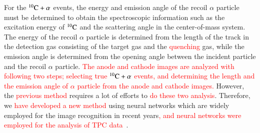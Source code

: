 \documentclass{jps-cp}
\begin{document}
For the ${}^{10}\rm{C}+\alpha$ events, the energy and emission angle of the recoil $\alpha$ particle must
be determined to obtain the spectroscopic information such as the excitation energy of ${}^{10}\rm{C}$
and the scattering angle in the center-of-mass system.
The energy of the recoil $\alpha$ particle is determined from the length of the track in the detection gas consisting of the target gas and the \textcolor{red}{quenching} gas,
while the emission angle is determined from the opening angle between the incident particle and the recoil $\alpha$ particle.
\textcolor{red}{The anode and cathode images are analyzed with following two steps;
  selecting true ${}^{10}\rm{C}+\alpha$ events,
  and determining the length and the emission angle of $\alpha$ particle from
  the anode and cathode images.}
However, the \textcolor{red}{previous method} requires a lot of efforts to
\textcolor{red}{do these two analysis}.
Therefore, we \textcolor{red}{have developed a new method} using neural networks which are widely employed for the image recognition in recent years\textcolor{red}{,
and neural networks were employed for the analysis of TPC data~\cite{attpc}}.
\end{document}
